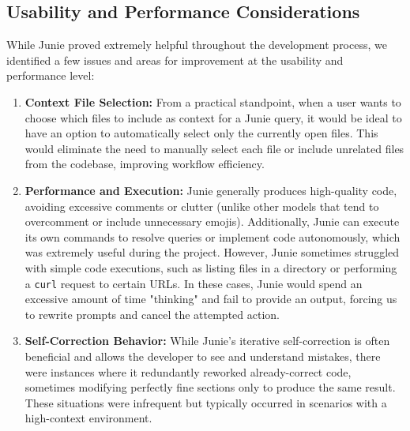 \documentclass[12pt, a4paper]{article}
\begin{document}
    \subsection{Usability and Performance Considerations}

    While Junie proved extremely helpful throughout the development process, we identified a few issues and areas for improvement at the usability and performance level:

    \begin{enumerate}
        \item \textbf{Context File Selection:} From a practical standpoint, when a user wants to choose which files to include as context for a Junie query, it would be ideal to have an option to automatically select only the currently open files. This would eliminate the need to manually select each file or include unrelated files from the codebase, improving workflow efficiency.

        \item \textbf{Performance and Execution:} Junie generally produces high-quality code, avoiding excessive comments or clutter (unlike other models that tend to overcomment or include unnecessary emojis). Additionally, Junie can execute its own commands to resolve queries or implement code autonomously, which was extremely useful during the project. However, Junie sometimes struggled with simple code executions, such as listing files in a directory or performing a \texttt{curl} request to certain URLs. In these cases, Junie would spend an excessive amount of time "thinking" and fail to provide an output, forcing us to rewrite prompts and cancel the attempted action.

        \item \textbf{Self-Correction Behavior:} While Junie's iterative self-correction is often beneficial and allows the developer to see and understand mistakes, there were instances where it redundantly reworked already-correct code, sometimes modifying perfectly fine sections only to produce the same result. These situations were infrequent but typically occurred in scenarios with a high-context environment.
    \end{enumerate}
\end{document}
